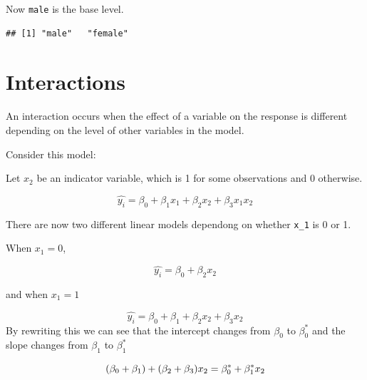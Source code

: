 \documentclass[
  openany]{book}
\newenvironment{Shaded}{\begin{snugshade}}{\end{snugshade}}
\newcommand{\DataTypeTok}[1]{\textcolor[rgb]{0.13,0.29,0.53}{#1}}
\newcommand{\KeywordTok}[1]{\textcolor[rgb]{0.13,0.29,0.53}{\textbf{#1}}}
\newcommand{\NormalTok}[1]{#1}
\newcommand{\OperatorTok}[1]{\textcolor[rgb]{0.81,0.36,0.00}{\textbf{#1}}}
\newcommand{\StringTok}[1]{\textcolor[rgb]{0.31,0.60,0.02}{#1}}
\begin{document}
\begin{Shaded}
\end{Shaded}

Now \texttt{male} is the base level.

\begin{Shaded}
\end{Shaded}

\begin{verbatim}
## [1] "male"   "female"
\end{verbatim}

\hypertarget{interactions}{%
\section{Interactions}\label{interactions}}

An interaction occurs when the effect of a variable on the response is different depending on the level of other variables in the model.

Consider this model:

Let \(x_2\) be an indicator variable, which is 1 for some observations and 0 otherwise.

\[\hat{y_i} = \beta_0 + \beta_1 x_1 + \beta_2 x_2 + \beta_3 x_1 x_2\]

There are now two different linear models dependong on whether \texttt{x\_1} is 0 or 1.

When \(x_1 = 0\),

\[\hat{y_i} = \beta_0  + \beta_2 x_2\]

and when \(x_1 = 1\)

\[\hat{y_i} = \beta_0 + \beta_1 + \beta_2 x_2 + \beta_3 x_2\]
By rewriting this we can see that the intercept changes from \(\beta_0\) to \(\beta_0^*\) and the slope changes from \(\beta_1\) to \(\beta_1^*\)

\[
(\beta_0 + \beta_1) + (\beta_2 + \beta_3 ) x_2 \\
 = \beta_0^* + \beta_1^* x_2
\]
\end{document}
